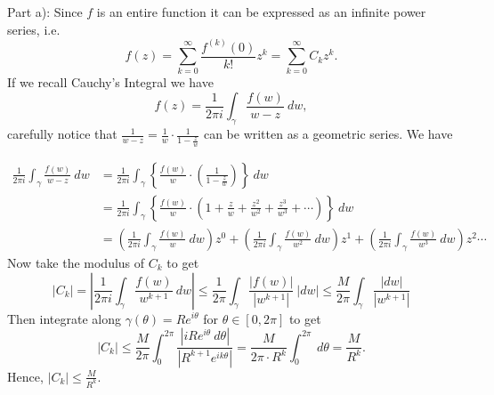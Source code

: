 \documentclass[12pt]{article}
\newenvironment{solution}[2][Solution]{\begin{trivlist}
\item[\hskip \labelsep {\bfseries #1}]}{\end{trivlist}}
\begin{document}
\begin{solution}{}
Part a): Since $f$ is an entire function it can be expressed as an infinite power series, i.e.
\[
f(z)=\sum_{k=0}^\infty\frac{f^{(k)}(0)}{k!}z^k=\sum_{k=0}^\infty C_kz^k.
\]
If we recall Cauchy's Integral we have
\[
f(z)=\frac{1}{2\pi i}\int_\gamma\frac{f(w)}{w-z}\ dw,
\]
carefully notice that $\frac{1}{w-z}=\frac{1}{w}\cdot\frac{1}{1-\frac{z}{w}}$ can be written as a geometric series. We have

\begin{align*}
\frac{1}{2\pi i}\int_\gamma\frac{f(w)}{w-z}\ dw &=\frac{1}{2\pi i}\int_\gamma\left\lbrace\frac{f(w)}{w}\cdot\left(\frac{1}{1-\frac{z}{w}}\right) \right\rbrace\ dw\\[8pt]
&=\frac{1}{2\pi i}\int_\gamma\left\lbrace\frac{f(w)}{w}\cdot\left(1+\frac{z}{w}+\frac{z^2}{w^2}+\frac{z^3}{w^3}+\cdots\right) \right\rbrace\ dw\\[8pt]
&=\left(\frac{1}{2\pi i}\int_\gamma \frac{f(w)}{w}\ dw\right)z^0+\left(\frac{1}{2\pi i}\int_\gamma \frac{f(w)}{w^2}\ dw\right)z^1+\left(\frac{1}{2\pi i}\int_\gamma \frac{f(w)}{w^3}\ dw\right)z^2\cdots
\end{align*}
Now take the modulus of $C_k$ to get
\[
|C_k|=\left\lvert\frac{1}{2\pi i}\int_\gamma \frac{f(w)}{w^{k+1}}\ dw \right\rvert\leq\frac{1}{2\pi}\int_\gamma\frac{|f(w)|}{|w^{k+1}|}\ |dw|\leq \frac{M}{2\pi}\int_\gamma\frac{|dw|}{|w^{k+1}|}
\]
Then integrate along $\gamma(\theta)=Re^{i\theta}$ for $\theta\in [0,2\pi]$ to get
\[
|C_k|\leq \frac{M}{2\pi}\int_0^{2\pi}\frac{|iRe^{i\theta}\ d\theta|}{|R^{k+1}e^{ik\theta}|}=\frac{M}{2\pi\cdot R^k}\int_0^{2\pi}\ d\theta=\frac{M}{R^k}.
\]
Hence, $|C_k|\leq \frac{M}{R^k}$.
\end{solution}
\pagebreak



\printindex
\end{document}
